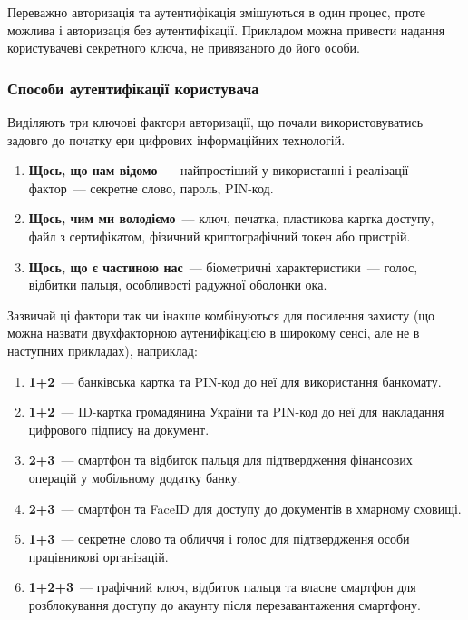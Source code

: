 Переважно авторизація та аутентифікація змішуються в один процес, проте можлива і авторизація без аутентифікації. Прикладом можна привести надання користувачеві секретного ключа, не привязаного до його особи.

\subsubsection{Способи аутентифікації користувача}
Виділяють три ключові фактори авторизації, що почали використовуватись задовго до початку ери цифрових інформаційних технологій.

\begin{enumerate}[label={\arabic*.}]
\item \textbf{Щось, що нам відомо}~--- найпростіший у використанні і реалізації фактор~--- секретне слово, пароль, PIN-код.
\item \textbf{Щось, чим ми володіємо}~--- ключ, печатка, пластикова картка доступу, файл з сертифікатом, фізичний криптографічний токен або пристрій.
\item \textbf{Щось, що є частиною нас}~--- біометричні характеристики~--- голос, відбитки пальця, особливості радужної оболонки ока.
\end{enumerate}

Зазвичай ці фактори так чи інакше комбінуються для посилення захисту (що можна назвати двухфакторною аутенифікацією в широкому сенсі, але не в наступних прикладах), наприклад:
\begin{enumerate}
\item \textbf{1+2}~--- банківська картка та PIN-код до неї для використання банкомату.
\item \textbf{1+2}~--- ID-картка громадянина України та PIN-код до неї для накладання цифрового підпису на документ.
\item \textbf{2+3}~--- смартфон та відбиток пальця для підтвердження фінансових операцій у мобільному додатку банку.
\item \textbf{2+3}~--- смартфон та FaceID для доступу до документів в хмарному сховищі.
\item \textbf{1+3}~--- секретне слово та обличчя і голос для підтвердження особи працівникові організацій.
\item \textbf{1+2+3}~--- графічний ключ, відбиток пальця та власне смартфон для розблокування доступу до акаунту після перезавантаження смартфону.

\end{enumerate}

